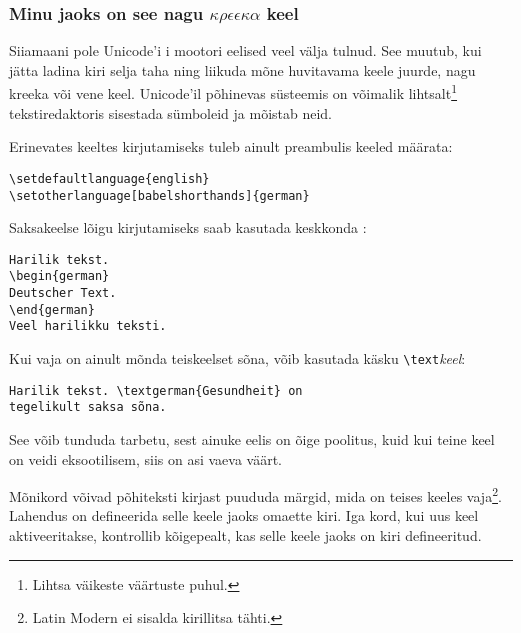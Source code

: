 \subsubsection{Minu jaoks on see nagu
$\kappa\rho\epsilon\epsilon\kappa\alpha$ keel}

Siiamaani pole Unicode'i i mootori eelised veel välja
tulnud. See muutub, kui jätta ladina kiri selja taha ning liikuda mõne
huvitavama keele juurde, nagu kreeka või vene keel. Unicode'il põhinevas
süsteemis on võimalik lihtsalt\footnote{Lihtsa väikeste väärtuste
puhul.} tekstiredaktoris sisestada sümboleid ja  mõistab
neid.

Erinevates keeltes kirjutamiseks tuleb ainult preambulis keeled
määrata:

\begin{lscommand}
\verb|\setdefaultlanguage{english}|\\
\verb|\setotherlanguage[babelshorthands]{german}|
\end{lscommand}

Saksakeelse lõigu kirjutamiseks saab kasutada keskkonda :

\begin{code}
\verb|Harilik tekst.|\\
\verb|\begin{german}|\\
\verb|Deutscher Text.|\\
\verb|\end{german}|\\
\verb|Veel harilikku teksti.|
\end{code}

Kui vaja on ainult mõnda teiskeelset sõna, võib kasutada käsku
\verb|\text|\emph{keel}:

\begin{code}
\verb|Harilik tekst. \textgerman{Gesundheit} on|\\
\verb|tegelikult saksa sõna.|
\end{code}

See võib tunduda tarbetu, sest ainuke eelis on õige poolitus, kuid kui
teine keel on veidi eksootilisem, siis on asi vaeva väärt.

Mõnikord võivad põhiteksti kirjast puududa märgid, mida on teises keeles
vaja\footnote{Latin Modern ei sisalda kirillitsa
tähti.}. Lahendus on defineerida selle keele jaoks omaette kiri. Iga
kord, kui uus keel aktiveeritakse, kontrollib 
kõigepealt, kas selle keele jaoks on kiri defineeritud.

